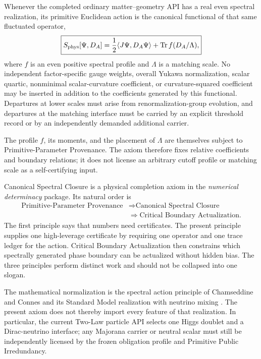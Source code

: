 \begin{axiom}
\label{ax:canonical-spectral-closure}
Whenever the completed ordinary matter--geometry API has a real even spectral realization,
its primitive Euclidean action is the canonical functional of that same fluctuated operator,
\[
 \boxed{
 S_{\rm phys}[\Psi,D_A]
 =\frac12\langle J\Psi,D_A\Psi\rangle
  +\operatorname{Tr} f(D_A/\Lambda),
 }
\]
where $f$ is an even positive spectral profile and $\Lambda$ is a matching scale.  No
independent factor-specific gauge weights, overall Yukawa normalization, scalar quartic,
nonminimal scalar-curvature coefficient, or curvature-squared coefficient may be inserted
in addition to the coefficients generated by this functional.  Departures at lower scales
must arise from renormalization-group evolution, and departures at the matching interface
must be carried by an explicit threshold record or by an independently demanded additional
carrier.

The profile $f$, its moments, and the placement of $\Lambda$ are themselves subject to
Primitive-Parameter Provenance.  The axiom therefore fixes relative coefficients and
boundary relations; it does not license an arbitrary cutoff profile or matching scale as a
self-certifying input.
\end{axiom}

\begin{remark}
Canonical Spectral Closure is a physical completion axiom in the \emph{numerical
determinacy} package.  Its natural order is
\[
\begin{aligned}
 \text{Primitive-Parameter Provenance}
 &\Longrightarrow \text{Canonical Spectral Closure}\\
 &\Longrightarrow \text{Critical Boundary Actualization}.
\end{aligned}
\]
The first principle says that numbers need certificates.  The present principle supplies one
high-leverage certificate by requiring one operator and one trace ledger for the action.
Critical Boundary Actualization then constrains which spectrally generated phase boundary
can be actualized without hidden bias.  The three principles perform distinct work and
should not be collapsed into one slogan.
\end{remark}

\begin{remark}
The mathematical normalization is the spectral action principle of Chamseddine and Connes
and its Standard Model realization with neutrino mixing
\cite{chamseddine-connes-spectral,chamseddine-connes-marcolli}.  The present axiom does not
thereby import every feature of that realization.  In particular, the current Two-Law
particle API selects one Higgs doublet and a Dirac-neutrino interface; any Majorana carrier
or neutral scalar must still be independently licensed by the frozen obligation profile and
Primitive Public Irredundancy.
\end{remark}


